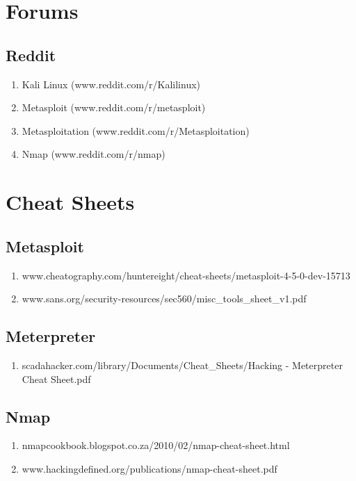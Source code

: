 \documentclass[a4paper]{article}
\begin{document}
\section{Forums}

\subsection{Reddit}

\begin{enumerate}
	\item Kali Linux (www.reddit.com/r/Kalilinux)
	\item Metasploit (www.reddit.com/r/metasploit)
	\item Metasploitation (www.reddit.com/r/Metasploitation) 
    \item Nmap (www.reddit.com/r/nmap)
\end{enumerate}

\section{Cheat Sheets}

\subsection{Metasploit}
\begin{enumerate}
	\item www.cheatography.com/huntereight/cheat-sheets/metasploit-4-5-0-dev-15713
	\item www.sans.org/security-resources/sec560/misc\_tools\_sheet\_v1.pdf
\end{enumerate}

\subsection{Meterpreter}
\begin{enumerate}
	\item scadahacker.com/library/Documents/Cheat\_Sheets/Hacking - Meterpreter Cheat  Sheet.pdf
\end{enumerate}

\subsection{Nmap}
\begin{enumerate}
	\item nmapcookbook.blogspot.co.za/2010/02/nmap-cheat-sheet.html
	\item www.hackingdefined.org/publications/nmap-cheat-sheet.pdf
\end{enumerate}
\end{document}
